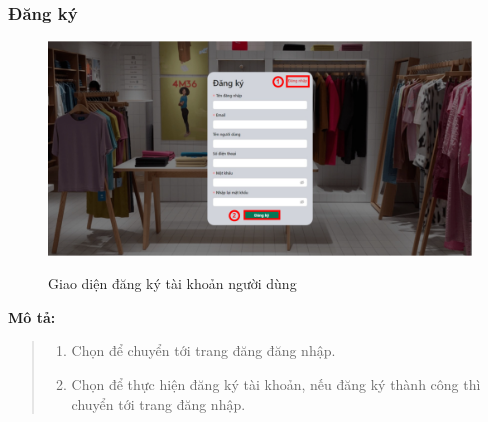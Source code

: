 \subsubsection{Đăng ký}
\begin{figure}[!htp]
    \centering
    \includegraphics[width=5in]{img/UI/new_customer/register.png}
    \label{2}
    \newline
    \caption{Giao diện đăng ký tài khoản người dùng}
\end{figure}
\textbf{Mô tả:}
\begin{quote}
    \begin{enumerate}
        \item Chọn để chuyển tới trang đăng đăng nhập.
        \item Chọn để thực hiện đăng ký tài khoản, nếu đăng ký thành công thì chuyển tới trang đăng nhập.
    \end{enumerate}
\end{quote}


